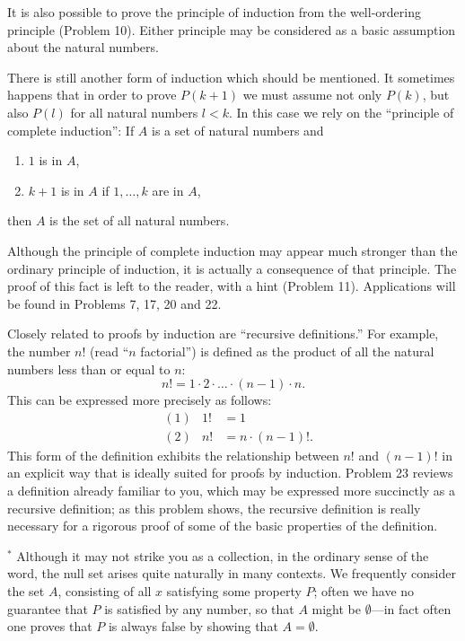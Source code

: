 It is also possible to prove the principle of induction from the well-ordering
principle (Problem 10). Either principle may be considered as a basic
assumption about the natural numbers.

There is still another form of induction which should be mentioned. It
sometimes happens that in order to prove $P(k+1)$ we must assume not only
$P(k)$, but also $P(l)$ for all natural numbers $l < k$. In this case we rely
on the ``principle of complete induction'': If $A$ is a set of natural numbers
and

\begin{enumerate}[label=(\arabic*),leftmargin=2.6em,itemsep=0pt,topsep=2pt]
\item $1$ is in $A$,
\item $k + 1$ is in $A$ if $1, \dots, k$ are in $A$,
\end{enumerate}

then $A$ is the set of all natural numbers.

Although the principle of complete induction may appear much stronger than
the ordinary principle of induction, it is actually a consequence of that
principle. The proof of this fact is left to the reader, with a hint
(Problem 11). Applications will be found in Problems 7, 17, 20 and 22.

Closely related to proofs by induction are ``recursive definitions.'' For
example, the number $n!$ (read ``$n$ factorial'') is defined as the product of
all the natural numbers less than or equal to $n$:
\[ n! = 1 \cdot 2 \cdot \ldots \cdot (n-1) \cdot n. \]
This can be expressed more precisely as follows:
\begin{align*}
&(1) & 1! &= 1\\
&(2) & n! &= n \cdot (n-1)!.
\end{align*}
This form of the definition exhibits the relationship between $n!$ and
$(n-1)!$ in an explicit way that is ideally suited for proofs by induction.
Problem 23 reviews a definition already familiar to you, which may be
expressed more succinctly as a recursive definition; as this problem shows,
the recursive definition is really necessary for a rigorous proof of some of
the basic properties of the definition.

$^{*}$ Although it may not strike you as a collection, in the ordinary sense of
the word, the null set arises quite naturally in many contexts. We frequently
consider the set $A$, consisting of all $x$ satisfying some property $P$;
often we have no guarantee that $P$ is satisfied by any number, so that $A$
might be $\emptyset$---in fact often one proves that $P$ is always false by
showing that $A = \emptyset$.


